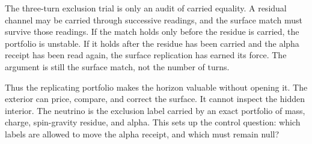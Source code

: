 The three-turn exclusion trial is only an audit of carried equality. A
residual channel may be carried through successive readings, and the surface
match must survive those readings. If the match holds only before the
residue is carried, the portfolio is unstable. If it holds after the
residue has been carried and the alpha receipt has been read again, the
surface replication has earned its force. The argument is still the surface
match, not the number of turns.

Thus the replicating portfolio makes the horizon valuable without opening
it. The exterior can price, compare, and correct the surface. It cannot
inspect the hidden interior. The neutrino is the exclusion label carried by
an exact portfolio of mass, charge, spin-gravity residue, and alpha. This
sets up the control question: which labels are allowed to move the alpha
receipt, and which must remain null?
